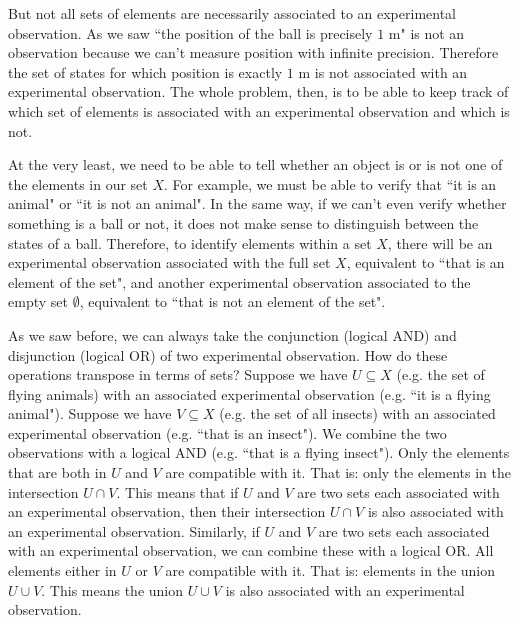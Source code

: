 \documentclass[11pt,letterpaper,fleqn]{memoir} %
\begin{document}
But not all sets of elements are necessarily associated to an experimental observation. As we saw ``the position of the ball is precisely $1$ m" is not an observation because we can't measure position with infinite precision. Therefore the set of states for which position is exactly $1$ m is not associated with an experimental observation. The whole problem, then, is to be able to keep track of which set of elements is associated with an experimental observation and which is not.

At the very least, we need to be able to tell whether an object is or is not one of the elements in our set $X$. For example, we must be able to verify that ``it is an animal" or ``it is not an animal". In the same way, if we can't even verify whether something is a ball or not, it does not make sense to distinguish between the states of a ball. Therefore, to identify elements within a set $X$, there will be an experimental observation associated with the full set $X$, equivalent to ``that is an element of the set", and another experimental observation associated to the empty set $\emptyset$, equivalent to ``that is not an element of the set".

As we saw before, we can always take the conjunction (logical AND) and disjunction (logical OR) of two experimental observation. How do these operations transpose in terms of sets? Suppose we have $U \subseteq X$ (e.g. the set of flying animals) with an associated experimental observation (e.g. ``it is a flying animal"). Suppose we have $V \subseteq X$ (e.g. the set of all insects) with an associated experimental observation (e.g. ``that is an insect"). We combine the two observations with a logical AND (e.g. ``that is a flying insect"). Only the elements that are both in $U$ and $V$ are compatible with it. That is: only the elements in the intersection $U \cap V$. This means that if $U$ and $V$ are two sets each associated with an experimental observation, then their intersection $U \cap V$ is also associated with an experimental observation. Similarly, if $U$ and $V$ are two sets each associated with an experimental observation, we can combine these with a logical OR. All elements either in $U$ or $V$ are compatible with it. That is: elements in the union $U \cup V$. This means the union $U \cup V$ is also associated with an experimental observation.
\end{document}
